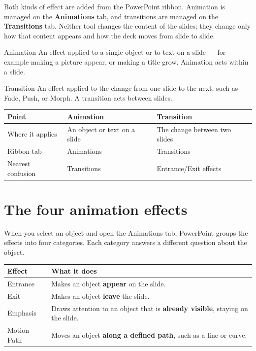 Both kinds of effect are added from the PowerPoint ribbon. Animation is
managed on the \textbf{Animations} tab, and transitions are managed on the
\textbf{Transitions} tab. Neither tool changes the content of the slides; they
change only how that content appears and how the deck moves from slide to
slide.

\begin{definitionbox}{Animation}
An effect applied to a single object or to text on a slide --- for example
making a picture appear, or making a title grow. Animation acts within a
slide.
\end{definitionbox}

\begin{definitionbox}{Transition}
An effect applied to the change from one slide to the next, such as Fade,
Push, or Morph. A transition acts between slides.
\end{definitionbox}

\begin{center}
\begin{tabular}{p{}p{}p{}}
\toprule
\textbf{Point} & \textbf{Animation} & \textbf{Transition} \\
\midrule
Where it applies & An object or text on a slide & The change between two slides \\
Ribbon tab & Animations & Transitions \\
Nearest confusion & Transitions & Entrance/Exit effects \\
\bottomrule
\end{tabular}
\end{center}

\section{The four animation effects}
When you select an object and open the Animations tab, PowerPoint groups the
effects into four categories. Each category answers a different question about
the object.

\begin{center}
\begin{tabular}{p{}p{}}
\toprule
\textbf{Effect} & \textbf{What it does} \\
\midrule
Entrance & Makes an object \textbf{appear} on the slide. \\
Exit & Makes an object \textbf{leave} the slide. \\
Emphasis & Draws attention to an object that is \textbf{already visible},
staying on the slide. \\
Motion Path & Moves an object \textbf{along a defined path}, such as a line or
curve. \\
\bottomrule
\end{tabular}
\end{center}

